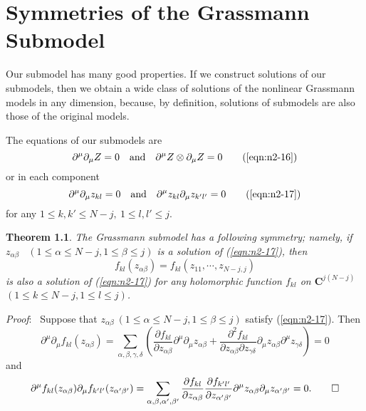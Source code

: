 \documentclass[makeidx,12pt,openany]{report}
\newtheorem{thm}[df]{Theorem}
\begin{document}
 \chapter{Symmetries of the Grassmann Submodel}
Our submodel has many good properties. If we construct solutions 
of our submodels, then we obtain a wide class of solutions of the 
nonlinear Grassmann models in any dimension, because, by definition, 
solutions of submodels are also those of the original models. 

The equations of our submodels are
\begin{equation}
 \partial^{\mu}\partial_{\mu}Z=0 \quad \mbox{and} \quad 
 \partial^{\mu}Z \otimes \partial_{\mu}Z=0
 \tag{\ref{eqn:n2-16}}
\end{equation}
or in each component
\begin{equation}
 \partial^{\mu}\partial_{\mu}z_{kl}=0 \quad \mbox{and} \quad 
 \partial^{\mu}z_{kl}\partial_{\mu}z_{k'l'}=0 
 \tag{\ref{eqn:n2-17}}
\end{equation}
for any $1 \le k,k' \le N-j, \ 1 \le l,l' \le j$. 
\begin{thm}
The Grassmann submodel has a 
following symmetry; namely, 
if $z_{\alpha \beta}$ \ $(1 \le \alpha \le N-j,1 \le \beta \le j)$ 
is a solution of (\ref{eqn:n2-17}), then 
\begin{equation}
 f_{kl}(z_{\alpha \beta})=f_{kl}(z_{11},\cdots,z_{N-j,j})
\end{equation}
is also a solution of (\ref{eqn:n2-17}) for any holomorphic function 
$f_{kl}$ on ${\mathbf{C}}^{j(N-j)}$ \ 
$(1 \le k \le N-j,1 \le l \le j)$. 
\end{thm}
\textit{Proof}: \ 
Suppose that $z_{\alpha \beta} \ (1 \le \alpha \le N-j,1 \le \beta \le j)$ 
satisfy (\ref{eqn:n2-17}). Then 
\begin{equation}
 \partial^{\mu}\partial_{\mu}f_{kl}(z_{\alpha \beta})
=\sum_{\alpha, \beta, \gamma, \delta}
 \left( 
 \frac{\partial f_{kl}}{\partial z_{\alpha \beta}}
 \partial^{\mu}\partial_{\mu}z_{\alpha \beta}
+\frac{\partial^2 f_{kl}}{\partial z_{\alpha \beta}\partial z_{\gamma \delta}}
 \partial_{\mu}z_{\alpha \beta}\partial^{\mu}z_{\gamma \delta}
 \right) =0
\end{equation}
and 
\begin{equation}
 \partial^{\mu}f_{kl}(z_{\alpha \beta})
 \partial_{\mu}f_{k'l'}(z_{\alpha' \beta'})
=\sum_{\alpha, \beta, \alpha', \beta'}
 \frac{\partial f_{kl}}{\partial z_{\alpha \beta}}
 \frac{\partial f_{k'l'}}{\partial z_{\alpha' \beta'}}
 \partial^{\mu}z_{\alpha \beta}\partial_{\mu}z_{\alpha' \beta'}=0. \qed 
\end{equation}
\end{document}
